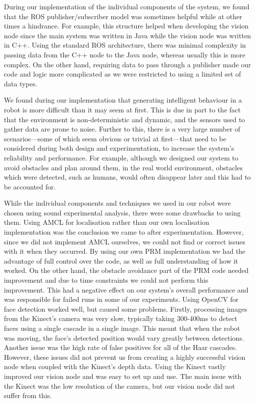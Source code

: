 \documentclass[conference]{IEEEtran}
\begin{document}
During our implementation of the individual components of the system, we found that the ROS publisher/subscriber model was sometimes helpful while at other times a hindrance. For example, this structure helped when developing the vision node since the main system was written in Java while the vision node was written in C++. Using the standard ROS architecture, there was minimal complexity in passing data from the C++ node to the Java node, whereas usually this is more complex. On the other hand, requiring data to pass through a publisher made our code and logic more complicated as we were restricted to using a limited set of data types.

We found during our implementation that generating intelligent behaviour in a robot is more difficult than it may seem at first. This is due in part to the fact that the environment is non-deterministic and dynamic, and the sensors used to gather data are prone to noise. Further to this, there is a very large number of scenarios---some of which seem obvious or trivial at first---that need to be considered during both design and experimentation, to increase the system's reliability and performance. For example, although we designed our system to avoid obstacles and plan around them, in the real world environment, obstacles which were detected, such as humans, would often disappear later and this had to be accounted for.

While the individual components and techniques we used in our robot were chosen using sound experimental analysis, there were some drawbacks to using them. Using AMCL for localisation rather than our own localisation implementation was the conclusion we came to after experimentation. However, since we did not implement AMCL ourselves, we could not find or correct issues with it when they occurred. By using our own PRM implementation we had the advantage of full control over the code, as well as full understanding of how it worked. On the other hand, the obstacle avoidance part of the PRM code needed improvement and due to time constraints we could not perform this improvement. This had a negative effect on our system's overall performance and was responsible for failed runs in some of our experiments. Using OpenCV for face detection worked well, but caused some problems. Firstly, processing images from the Kinect's camera was very slow, typically taking 300-400ms to detect faces using a single cascade in a single image. This meant that when the robot was moving, the face's detected position would vary greatly between detections. Another issue was the high rate of false positives for all of the Haar cascades. However, these issues did not prevent us from creating a highly successful vision node when coupled with the Kinect's depth data. Using the Kinect vastly improved our vision node and was easy to set up and use. The main issue with the Kinect was the low resolution of the camera, but our vision node did not suffer from this.
\end{document}
